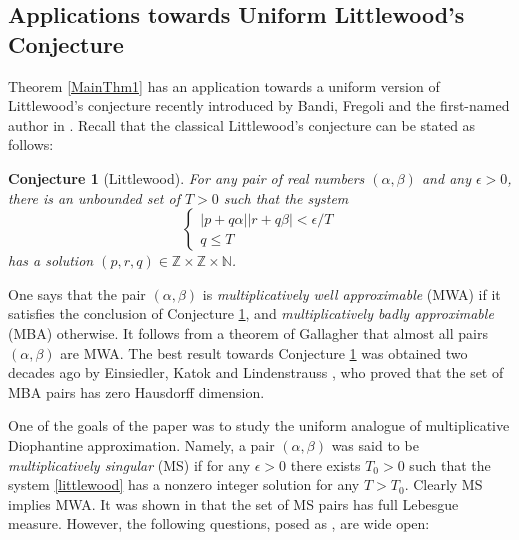 \documentclass[reqno,12pt]{amsart}
\newtheorem{conjecture}[theorem]{Conjecture}
\theoremstyle{definition}
\numberwithin{equation}{section}
\newcommand{\NN}{\mathbb{N}}
\newcommand{\ZZ}{\mathbb{Z}}
\newcommand {\new}[1]   {\textcolor{blue}{#1}}
\newcommand {\comm}[1]   {\textcolor{red}{#1}}
\begin{document}
\subsection{Applications towards Uniform Littlewood's Conjecture}\label{S:imply}
Theorem \ref{MainThm1} 
has an application towards a uniform version of Littlewood's conjecture recently introduced by Bandi, Fregoli and the first-named author in \cite{BFK25}. 
Recall that the classical Littlewood's conjecture can be stated as follows: 
\begin{conjecture}[Littlewood]\label{C:LC}
For any pair of real numbers $(\alpha,\beta)$ and any $\epsilon>0$, there is an unbounded set of $T>0$ such that the %
system \begin{equation}\label{littlewood}
		\begin{cases}
		|p+q\alpha||r+q\beta|<\epsilon/T\\
		q\leq T
		\end{cases}
	\end{equation}
has a solution $(p,r,q)\in\ZZ\times\ZZ\times\NN$.
\end{conjecture}
One says that the pair $(\alpha,\beta)$ is {\sl multiplicatively well approximable} (MWA) if it satisfies the conclusion of Conjecture \ref{C:LC}, and {\sl multiplicatively badly approximable} (MBA) otherwise. It follows from  {a theorem of Gallagher \cite{Gal62}} %
that almost all pairs $(\alpha,\beta)$ are MWA. The best result towards Conjecture \ref{C:LC} was obtained two decades ago by Einsiedler, Katok and Lindenstrauss \cite{EKL06}, who proved that the set of   MBA pairs has zero Hausdorff dimension.

\smallskip
One of the goals of the paper \cite{BFK25} was to study the uniform analogue of multiplicative Diophantine approximation. Namely, a pair $(\alpha,\beta)$ was said to be {\sl multiplicatively singular} (MS) if for any $\epsilon>0$ there exists $T_0 > 0$ such that the  system \eqref{littlewood}
has a nonzero integer solution {for any $T > T_0$}. Clearly MS implies MWA. It was shown in \cite{BFK25} that the set of MS pairs has full Lebesgue measure.  However, the following questions, posed as \cite[Question 4.6]{BFK25}, are wide open: 
\end{document}
